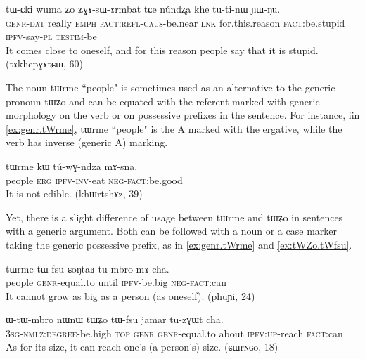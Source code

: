 \documentclass[oldfontcommands,oneside,a4paper,11pt]{article}
\newcommand{\ipa}[1]{{\phon \mbox{#1}}} %
\begin{document}
\begin{exe}
\ex  \label{ex:tWCki}
\gll
\ipa{tɯ-ɕki} 	\ipa{wuma} 	\ipa{ʑo} 	\ipa{ʑɣɤ-sɯ-ɤrmbat} 	\ipa{tɕe} 	\ipa{núndʐa} 	\ipa{khe} 	\ipa{tu-ti-nɯ} 	\ipa{ɲɯ-ŋu.} \\
\textsc{genr-dat} really \textsc{emph} \textsc{fact:refl-caus}-be.near \textsc{lnk} for.this.reason \textsc{fact}:be.stupid \textsc{ipfv}-say-\textsc{pl} \textsc{testim}-be \\
\glt It comes close to oneself, and for this reason people say that it is stupid. (tɤkhepɣɤtɕɯ, 60)
\end{exe}

The noun \ipa{tɯrme} ``people" is sometimes used as an alternative to the generic pronoun \ipa{tɯʑo} and can be equated with the referent marked with generic morphology on the verb or on possessive prefixes in the sentence. For instance, iin \ref{ex:genr.tWrme}, \ipa{tɯrme} ``people" is the A marked with the ergative, while the verb has inverse (generic A) marking.


\begin{exe}
\ex  \label{ex:genr.tWrme}
\gll
\ipa{tɯrme} 	\ipa{kɯ} 	\ipa{tú-wɣ-ndza} 	\ipa{mɤ-sna.} \\
people \textsc{erg} \textsc{ipfv-inv}-eat \textsc{neg-fact}:be.good \\
\glt It is not edible. (khɯrtshɤz, 39)
\end{exe}

Yet, there is a slight difference of usage between \ipa{tɯrme} and \ipa{tɯʑo} in sentences with a generic argument. Both can be followed with a noun or a case marker taking the generic possessive prefix, as in \ref{ex:genr.tWrme} and \ref{ex:tWZo.tWfsu}. 

\begin{exe}
\ex  \label{ex:genr.tWrme}
\gll
\ipa{tɯrme} 	\ipa{tɯ-fsu} 	\ipa{ɕoŋtaʁ} 	\ipa{tu-mbro} 	\ipa{mɤ-cha.} \\
people \textsc{genr}-equal.to until \textsc{ipfv}-be.big \textsc{neg-fact}:can \\ 
\glt It cannot grow as big as a person (as oneself). (phuɲi, 24)
\end{exe}

\begin{exe}
\ex  \label{ex:tWZo.tWfsu}
\gll
\ipa{ɯ-tɯ-mbro} 	\ipa{nɯnɯ} 	\ipa{tɯʑo} 	\ipa{tɯ-fsu} 	\ipa{jamar} 	\ipa{tu-zɣɯt} 	\ipa{cha.}  \\
\textsc{3sg-nmlz:degree}-be.high \textsc{top} \textsc{genr} \textsc{genr}-equal.to about \textsc{ipfv:up}-reach \textsc{fact}:can \\
\glt As for its size, it can reach one's (a person's) size. (ɕɯrɴɢo, 18)
\end{exe}
\end{document}
